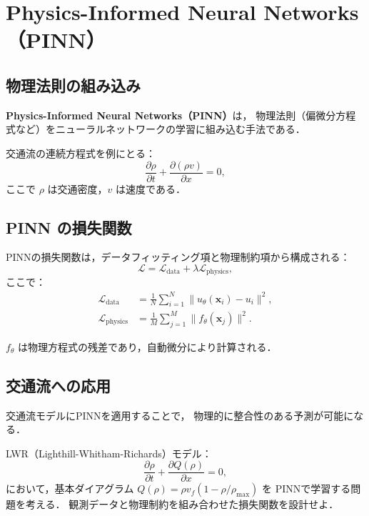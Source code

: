 \section{Physics-Informed Neural Networks（PINN）}
\label{sec:pinn}

\subsection{物理法則の組み込み}

\textbf{Physics-Informed Neural Networks（PINN）}\cite{Raissi2019}は，
物理法則（偏微分方程式など）をニューラルネットワークの学習に組み込む手法である．

交通流の連続方程式を例にとる：
\begin{equation}
  \frac{\partial \rho}{\partial t} + \frac{\partial (\rho v)}{\partial x} = 0,
  \label{eq:continuity}
\end{equation}
ここで $\rho$ は交通密度，$v$ は速度である．

\subsection{PINN の損失関数}

PINNの損失関数は，データフィッティング項と物理制約項から構成される：
\begin{equation}
  \mathcal{L} = \mathcal{L}_{\mathrm{data}} + \lambda \mathcal{L}_{\mathrm{physics}},
  \label{eq:pinn-loss}
\end{equation}
ここで：
\begin{align}
  \mathcal{L}_{\mathrm{data}} &= \frac{1}{N} \sum_{i=1}^{N} \|u_\theta(\boldsymbol{x}_i) - u_i\|^2, \\
  \mathcal{L}_{\mathrm{physics}} &= \frac{1}{M} \sum_{j=1}^{M} \|f_\theta(\boldsymbol{x}_j)\|^2.
\end{align}

$f_\theta$ は物理方程式の残差であり，自動微分により計算される．

\subsection{交通流への応用}

交通流モデルにPINNを適用することで，
物理的に整合性のある予測が可能になる．

\begin{example}
  LWR（Lighthill-Whitham-Richards）モデル：
  \begin{equation}
    \frac{\partial \rho}{\partial t} + \frac{\partial Q(\rho)}{\partial x} = 0,
  \end{equation}
  において，基本ダイアグラム $Q(\rho) = \rho v_f (1 - \rho/\rho_{\max})$ を
  PINNで学習する問題を考える．
  観測データと物理制約を組み合わせた損失関数を設計せよ．
\end{example}


